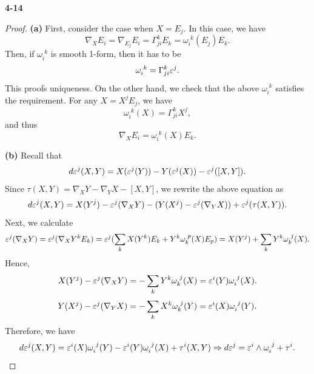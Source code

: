 \documentclass[11pt, a4paper]{article}
\theoremstyle{plain}
\theoremstyle{definition}
\theoremstyle{remark}
\newcommand{\gm}{\Gamma}
\begin{document}
\noindent\textbf{4-14}
\begin{proof}
    \textbf{(a)} First, consider the case when $X = E_j$. In this case, we have
    \[ \nabla_X E_i = \nabla_{E_j} E_i = \gm_{ji}^k E_k = \omega_i^{\,\, k} (E_j)E_k. \]
    Then, if $\omega_i^{\,\,k}$ is smooth 1-form, then it has to be $$\omega_i^{\,\, k} = \gm_{ji}^k \eps^j.$$
    This proofs uniqueness. On the other hand, we check that the above $\omega_i^{\,\, k}$ satisfies the requirement. For any $X = X^j E_j$, we have
    \[ \omega_i^{\,\, k}(X) = \gm_{ji}^k X^j, \]
    and thus 
    \[  \nabla_X E_i = \omega_i^{\,\, k}(X)E_k. \]

    \textbf{(b)} Recall that
    \[ d\varepsilon^j(X,Y) = X(\varepsilon^j(Y)) - Y(\varepsilon^j(X)) - \varepsilon^j([X,Y]). \]
    Since $\tau(X,Y) = \nabla_X Y - \nabla_Y X - [X,Y]$, we rewrite the above equation as
    \[ d\varepsilon^j(X,Y) = X(Y^j) - \varepsilon^j(\nabla_X Y) - (Y(X^j) - \varepsilon^j(\nabla_Y X)) + \varepsilon^j(\tau(X,Y)). \]
    Next, we calculate
    \[\varepsilon^j(\nabla_X Y) = \varepsilon^j(\nabla_X Y^kE_k) = \varepsilon^j(\sum_k X(Y^k)E_k + Y^k \omega_k^{\,\,p}(X)E_p) = X(Y^j) + \sum_kY^k \omega_k^{\,\,j}(X). \]
    Hence,
    \[X(Y^j) - \varepsilon^j(\nabla_X Y) = -\sum_kY^k \omega_k^{\,\,j}(X) = \varepsilon^i(Y)\omega_i^{\,\,j}(X). \]
    \[Y(X^j) - \varepsilon^j(\nabla_Y X) = -\sum_kX^k \omega_k^{\,\,j}(Y) = \varepsilon^i(X)\omega_i^{\,\,j}(Y). \]
    Therefore, we have
    \[ d\varepsilon^j(X,Y) = \varepsilon^i(X)\omega_i^{\,\,j}(Y) - \varepsilon^i(Y)\omega_i^{\,\,j}(X) + \tau^i(X,Y) \Rightarrow d\varepsilon^j = \varepsilon^i\wedge\omega_i^{\,\,j} + \tau^i. \]
\end{proof}
\end{document}
